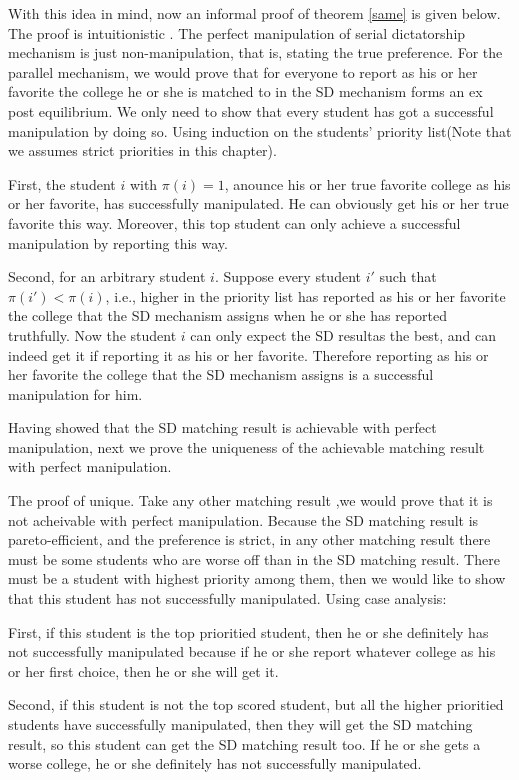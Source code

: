 With this idea in mind, now an informal proof of theorem \ref{same} is given below. The proof is intuitionistic . The perfect manipulation of serial dictatorship mechanism is just non-manipulation, that is, stating the true preference. For the parallel mechanism, we would prove that for everyone to report as his or her favorite  the college he or she is matched to in the SD mechanism forms an ex post equilibrium. We only need to show that every student has got a successful manipulation by doing so. Using induction on the students' priority list(Note that we assumes strict priorities in this chapter).

First, the student $i$ with $\pi(i)=1$, anounce his or her true favorite college as his or her favorite, has successfully manipulated. He can obviously get  his or her true favorite this way. Moreover, this top student can only achieve a successful manipulation by reporting this way.

Second, for  an arbitrary student $i$. Suppose every student $i'$ such that $\pi(i')<\pi(i)$, i.e., higher in the priority list has reported as his or her favorite  the college that the SD mechanism assigns when he or she has reported truthfully. Now the student $i$ can only expect the SD resultas the best, and can indeed get it if reporting it as his or her favorite. Therefore reporting  as his or her favorite  the college that the SD mechanism assigns is a successful manipulation for him.

Having showed that the SD matching result is achievable with perfect manipulation, next we prove the uniqueness of the achievable matching result with perfect manipulation.

The proof of unique. Take any other matching result ,we would prove that it is not acheivable with perfect manipulation. Because the SD matching result is pareto-efficient, and the preference is strict, in any other matching result there must be some students who are worse off than in the SD matching result. There must be a student with highest priority among them, then we would like to show that this student has not successfully manipulated. Using case analysis: 

First, if this student is the top prioritied student, then he or she definitely has not successfully manipulated because if he or she report whatever college as his or her first choice, then he or she will get it.

Second, if  this student is not the top scored student, but all the higher prioritied students have successfully manipulated, then they will get the SD matching result, so this student can get the SD  matching result too. If he or she gets a worse college, he or she definitely has not successfully manipulated.

